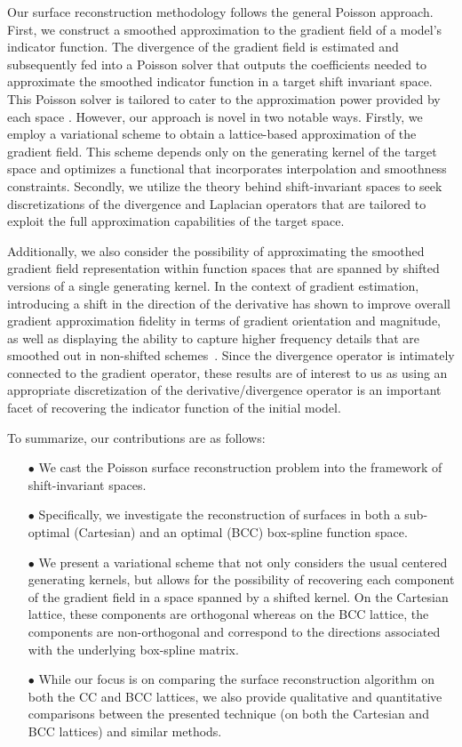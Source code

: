 Our surface reconstruction methodology follows the general Poisson
approach. First, we construct a smoothed approximation to the gradient
field of a model's indicator function. The divergence of the gradient
field is estimated and subsequently fed into a Poisson solver that
outputs the coefficients needed to approximate the smoothed indicator
function in a target shift invariant space. This Poisson solver is tailored to cater to the approximation power provided by each space \cite{}. However, our approach is novel in two notable ways. Firstly, we employ a variational scheme to obtain a lattice-based approximation of the gradient field. This
scheme depends only on the generating kernel of the target space and optimizes a functional that incorporates interpolation and smoothness constraints. Secondly, we utilize the theory behind shift-invariant spaces to seek discretizations of the divergence and Laplacian operators that are tailored to exploit the full approximation capabilities of the target space. 


Additionally, we also consider the possibility of approximating the
smoothed gradient field representation within function spaces that are
spanned by shifted versions of a single generating kernel. In the
context of gradient estimation, introducing a shift in the direction
of the derivative has shown to improve overall gradient
approximation fidelity in terms of gradient orientation and magnitude,
as well as displaying the ability to capture higher frequency details
that are smoothed out in non-shifted schemes~\cite{gradrev}. Since the
divergence operator is intimately connected to the gradient operator,
these results are of interest to us as using an appropriate
discretization of the derivative/divergence operator is an important facet
of recovering the indicator function of the initial model.

To summarize, our contributions are as follows:
\begin{itemize}
\item[$\bullet$] We cast the Poisson surface reconstruction problem
  into the framework of shift-invariant spaces.
\item[$\bullet$] Specifically, we investigate the reconstruction of
  surfaces in both a sub-optimal (Cartesian) and an optimal (BCC)
  box-spline function space.
\item[$\bullet$] We present a variational scheme that not only considers
  the usual centered generating kernels, but allows for the
  possibility of recovering each component of the gradient field in a
  space spanned by a shifted kernel. On the Cartesian
  lattice, these components are orthogonal whereas on the BCC lattice,
  the components are non-orthogonal and correspond to the directions
  associated with the underlying box-spline matrix.
\item[$\bullet$] While our focus is on comparing the surface reconstruction algorithm on both the CC and BCC lattices, we also provide qualitative and quantitative comparisons between the presented technique (on both the Cartesian and BCC lattices) and similar methods. 
\end{itemize}
